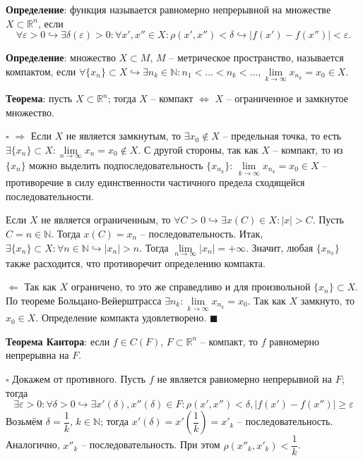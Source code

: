 \documentclass[12pt, a4paper, reqno]{article}
\begin{document}
    \textbf{Определение}: функция называется равномерно непрерывной на множестве
    $X\subset\mathbb{R}^n$, если
    \begin{equation*}
        \forall\varepsilon > 0\hookrightarrow \exists\delta(\varepsilon) > 0: \forall x', x''\in X:
        \rho(x', x'') < \delta \hookrightarrow |f(x') - f(x'')| < \varepsilon.
    \end{equation*}

    \textbf{Определение}: множество $X \subset M$, $M$ -- метрическое пространство, называется
    компактом, если
    $\forall \{x_n\} \subset X \hookrightarrow \exists n_k \in \mathbb{N}: n_1 < \ldots < n_k < \ldots,
    \lim\limits_{k \to \infty} x_{n_k} = x_0 \in X$.

    \textbf{Теорема}: пусть $X \subset \mathbb{R}^n$; тогда $X$ -- компакт $\iff$ $X$ -- ограниченное
    и замкнутое множество.

    $\square$ $\boxed{\Rightarrow}$ Если $X$ не является замкнутым, то $\exists x_0 \not\in X$ --
    предельная точка, то есть $\exists \{x_n\} \subset X: \lim\limits_{n \to \infty} x_n = x_0 \not\in X$.
    С другой стороны, так как $X$ -- компакт, то из $\{x_n\}$ можно выделить подпоследовательность
    $\{x_{n_k}\}$: $\lim\limits_{k \to \infty} x_{n_k} = x_0 \in X$ -- противоречие в силу
    единственности частичного предела сходящейся последовательности.

    Если $X$ не является ограниченным, то $\forall C > 0 \hookrightarrow \exists x(C) \in X: |x| > C$.
    Пусть $C = n \in \mathbb{N}$. Тогда $x(C) = x_n$ -- последовательность.
    Итак, $\exists \{x_n\} \subset X: \forall n \in \mathbb{N} \hookrightarrow |x_n| > n$. Тогда
    $\lim\limits_{n \to \infty} |x_n| = +\infty$. Значит, любая $\{x_{n_k}\}$ также расходится, что
    противоречит определению компакта.

    $\boxed{\Leftarrow}$ Так как $X$ ограничено, то это же справедливо и для произвольной
    $\{x_n\} \subset X$. По теореме Больцано-Вейерштрасса
    $\exists n_k: \lim\limits_{k \to \infty} {x_{n_k}} = x_0$. Так как $X$ замкнуто, то $x_0 \in X$.
    Определение компакта удовлетворено. $\blacksquare$

    \textbf{Теорема Кантора}: если $f \in C(F)$, $F \subset \mathbb{R}^n$ -- компакт, то $f$
    равномерно непрерывна на $F$.

    $\square$ Докажем от противного. Пусть $f$ не является равномерно непрерывной на $F$; тогда
    \begin{equation*}
        \exists\varepsilon > 0: \forall\delta > 0 \hookrightarrow \exists x'(\delta), x''(\delta)
        \in F: \rho(x', x'') < \delta, |f(x') - f(x'')| \geq \varepsilon
    \end{equation*}
    Возьмём $\delta = \dfrac{1}{k}$, $k\in\mathbb{N}$; тогда $x'(\delta) =
    x'\left(\dfrac{1}{k}\right) = x'_k$ -- последовательность. Аналогично, $x''_k$ --
    последовательность. При этом $\rho(x''_k, x'_k) < \dfrac{1}{k}$.
\end{document}
